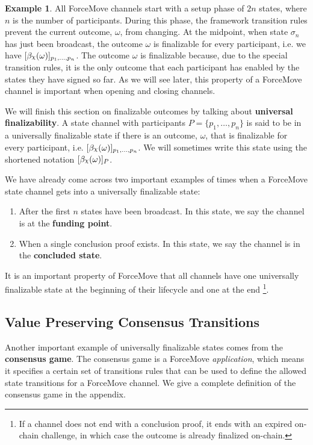 \documentclass{article}
\DeclareRobustCommand{\rchi}{{\mathpalette\irchi\relax}}
\newcommand{\irchi}[2]{\raisebox{\depth}{$#1\chi$}} %
\theoremstyle{definition}
\newtheorem{example}{Example}[section]
\newcommand{\enf}[1]{[#1]}
\begin{document}
\begin{example}{}
  All ForceMove channels start with a setup phase of $2n$ states, where $n$ is the number of participants.
  During this phase, the framework transition rules prevent the current outcome, $\omega$, from changing.
  At the midpoint, when state $\sigma_n$ has just been broadcast, the outcome
  $\omega$ is finalizable for every participant, i.e. we have
  $\enf{\beta_\rchi(\omega)}_{p_1, \dots, p_n}$.
  The outcome $\omega$ is finalizable because, due to the special transition rules,
  it is the only outcome that each participant has enabled by the states they have signed so far.
  As we will see later, this property of a ForceMove channel is important when opening and
  closing channels.
\end{example}

We will finish this section on finalizable outcomes by talking about \textbf{universal finalizability}.
A state channel with participants $P = \{p_1, \dots, p_n\}$ is said to be in a universally finalizable
state if there is an outcome, $\omega$, that is finalizable for every participant, i.e.
$\enf{\beta_\rchi(\omega)}_{p_1,\dots, p_n}$.
We will sometimes write this state using the shortened notation $\enf{\beta_\rchi(\omega)}_P$.

We have already come across two important examples of times when a ForceMove state channel
gets into a universally finalizable state:
\begin{enumerate}
  \item After the first $n$ states have been broadcast. In this state, we say the channel is at the \textbf{funding point}.
  \item When a single conclusion proof exists. In this state, we say the channel is in the \textbf{concluded state}.
\end{enumerate}
It is an important property of ForceMove that all channels have one universally finalizable
state at the beginning of their lifecycle and one at the end
\footnote{If a channel does not end with a conclusion proof, it ends with an expired on-chain challenge,
in which case the outcome is already finalized on-chain.}.

\subsection{Value Preserving Consensus Transitions}

Another important example of universally finalizable states comes from the \textbf{consensus game}.
The consensus game is a ForceMove \textit{application}, which means it specifies a certain
set of transitions rules that can be used to define the allowed state transitions for a ForceMove
channel.
We give a complete definition of the consensus game in the appendix.
\end{document}
